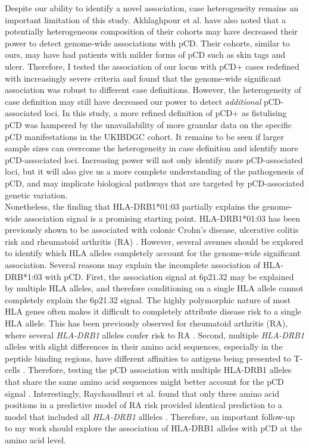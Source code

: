   Despite our ability to identify a novel association, case heterogeneity remains an important limitation of this study. Akhlaghpour et al. have also noted that a potentially heterogeneous composition of their cohorts may have decreased their power to detect genome-wide associations with pCD. Their cohorts, similar to ours, may have had patients with milder forms of pCD such as skin tags and ulcer. Therefore, I tested the association of our locus with pCD+ cases redefined with increasingly severe criteria and found that the genome-wide significant association was robust to different case definitions. However, the heterogeneity of case definition may still have decreased our power to detect \textit{additional} pCD-associated loci. In this study, a more refined definition of pCD+ as fistulising pCD was hampered by the unavailability of more granular data on the specific pCD manifestations in the UKIBDGC cohort. It remains to be seen if larger sample sizes can overcome the heterogeneity in case definition and identify more pCD-associated loci. Increasing power will not only identify more pCD-associated loci, but it will also give us a more complete understanding of the pathogenesis of pCD, and may implicate biological pathways that are targeted by pCD-associated genetic variation. \\


  Nonetheless, the finding that HLA-DRB1*01:03 partially explains the genome-wide association signal is a promising starting point. HLA-DRB1*01:03 has been previously shown to be associated with colonic Crohn's disease, ulcerative colitis risk \cite{Goyette2015-xx,Cleynen2016-ha} and rheumatoid arthritis (RA) \cite{Klimenta2019-be}. However, several avenues should be explored to identify which HLA alleles completely account for the genome-wide significant association. Several reasons may explain the incomplete association of HLA-DRB*1:03 with pCD. First, the association signal at 6p21.32 may be explained by multiple HLA alleles, and therefore conditioning on a single HLA allele cannot completely explain the 6p21.32 signal. The highly polymorphic nature of most HLA genes often makes it difficult to completely attribute disease risk to a single HLA allele. This has been previously observed for rheumatoid arthritis (RA), where several \textit{HLA-DRB1} alleles confer risk to RA \cite{Van_Drongelen2017-dh}. Second, multiple \textit{HLA-DRB1} alleles with slight differences in their amino acid sequences, especially in the peptide binding regions, have different affinities to antigens being presented to T-cells \cite{Wang2022-hk}. Therefore, testing the pCD association with multiple HLA-DRB1 alleles that share the same amino acid sequences might better account for the pCD signal \cite{Molineros2019-mu}. Interestingly, Raychaudhuri et al. found that only three amino acid positions in a predictive model of RA risk provided identical prediction to a model that included all \textit{HLA-DRB1} allleles \cite{Raychaudhuri2012-em}. Therefore, an important follow-up to my work should explore the association of HLA-DRB1 alleles with pCD at the amino acid level. \\

